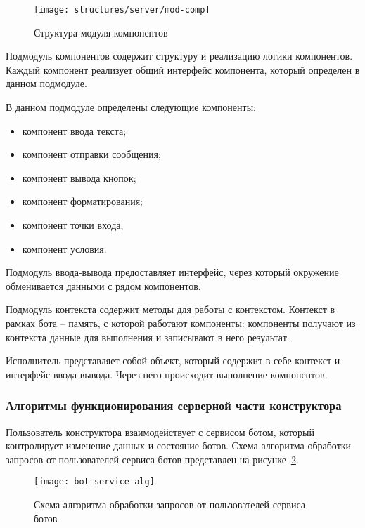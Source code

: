 \begin{figure}[ht]
	\centering
	\vspace{\toppaddingoffigure}
	\texttt{[image: structures/server/mod-comp]}
	\caption{Структура модуля компонентов}
	\label{f:mod-comp-struct}
\end{figure}

Подмодуль компонентов содержит структуру и реализацию логики
компонентов. Каждый компонент реализует общий интерфейс компонента,
который определен в данном подмодуле.

В данном подмодуле определены следующие компоненты:
\begin{itemize}
	\item 	компонент ввода текста;
	\item 	компонент отправки сообщения;
	\item 	компонент вывода кнопок;
	\item 	компонент форматирования;
	\item 	компонент точки входа;
	\item 	компонент условия.
\end{itemize}

Подмодуль ввода-вывода предоставляет интерфейс, через который
окружение обменивается данными с рядом компонентов.

Подмодуль контекста содержит методы для работы с контекстом.
Контекст в рамках бота – память, с которой работают компоненты:
компоненты получают из контекста данные для выполнения и записывают в
него результат.

Исполнитель представляет собой объект, который содержит в себе
контекст и интерфейс ввода-вывода. Через него происходит выполнение
компонентов.


\subsubsection{Алгоритмы функционирования серверной части конструктора}

Пользователь конструктора взаимодействует с сервисом ботом, который
контролирует изменение данных и состояние ботов.
Схема алгоритма обработки запросов от пользователей сервиса ботов
представлен на рисунке~\ref{f:bot-service-alg}.

\begin{figure}[hp]
	\centering
	\texttt{[image: bot-service-alg]}
	\caption{Схема алгоритма обработки запросов от пользователей сервиса ботов}
	\label{f:bot-service-alg}
\end{figure}

